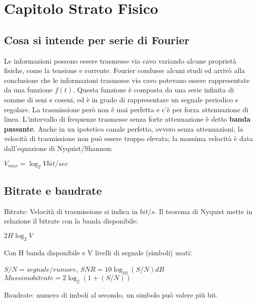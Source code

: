 \section{Capitolo Strato Fisico}

\subsection{Cosa si intende per serie di Fourier}

Le informazioni possono essere trasmesse via cavo variando alcune proprietà fisiche, come la
tensione e corrente. Fourier condusse alcuni studi ed arrivò alla conclusione che le informazioni
trasmesse via cavo potevano essere rappresentate da una funzione $f(t)$. Questa funzione è
composta da una serie infinita di somme di seni e coseni, ed è in grado di rappresentare un segnale
periodico e regolare. La trasmissione però non è mai perfetta e c'è per forza attenuazione di linea.
L'intervallo di frequenze trasmesse senza forte attenuazione è detto \textbf{banda passante}.
Anche in un ipotetico canale perfetto, ovvero senza attenuazioni, la velocità di trasmissione non
può essere troppo elevata; la massima velocità è data dall'equazione di Nyquist/Shannon:

\begin{center}

$V_{max} = \log_{2} V  bit/sec$

\end{center}

\subsection{Bitrate e baudrate}

Bitrate: Velocità di trasmissione si indica in $bit/s$. Il teorema di Nyquist mette in relazione il bitrate con la banda disponibile:

\begin{center}

	$2H\log_2V$

\end{center}

Con H banda disponibile e V livelli di segnale (simboli) usati:

\begin{center}

	$S/N = segnale/rumore$,  $SNR = 10\log_{10} (S/N) dB$
	\newline
	$Massimo bitrate = 2\log_2 (1+(S/N))$

\end{center}	

Baudrate: numero di imboli al secondo, un simbolo può valere più bit.

